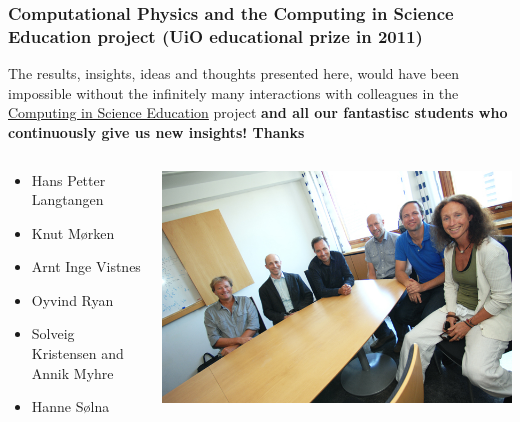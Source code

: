 \documentclass{beamer}
\begin{document}
\begin{frame}
\frametitle{Computational Physics and  the Computing in Science Education project (UiO educational prize in 2011)}

\begin{block}{}
The results, insights, ideas and thoughts presented here, would have been impossible without the infinitely many  interactions with colleagues in the \href{{http://www.mn.uio.no/english/about/collaboration/cse/}}{Computing in Science Education} project \textbf{and all our fantastisc students who continuously give us new insights! Thanks}
\end{block}
\begin{columns}
\begin{block}{}
\begin{itemize}
\item Hans Petter Langtangen

\item Knut Mørken

\item Arnt Inge Vistnes

\item Oyvind Ryan

\item Solveig Kristensen and Annik Myhre

\item Hanne Sølna
\end{itemize}

\noindent
\end{block}

\centerline{\includegraphics[width=1.0\linewidth]{fig-future/thegang.jpg}}



\end{columns}
\end{frame}
\end{document}
